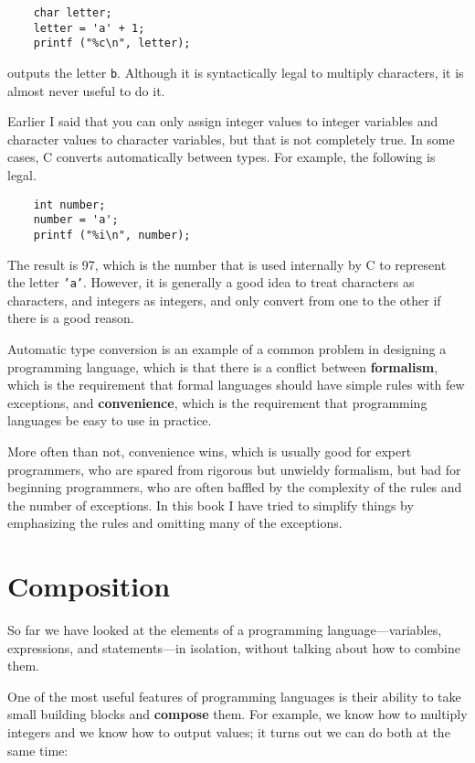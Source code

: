 \begin{verbatim}
    char letter;
    letter = 'a' + 1;
    printf ("%c\n", letter);
\end{verbatim}
%
outputs the letter {\tt b}.  Although it is syntactically legal
to multiply characters, it is almost never useful to do it.

Earlier I said that you can only assign integer values to
integer variables and character values to character variables,
but that is not completely true.  In some cases, C converts
automatically between types.  For example, the following is
legal.

\begin{verbatim}
    int number;
    number = 'a';
    printf ("%i\n", number);
\end{verbatim}
%
The result is 97, which is the number that is used internally
by C to represent the letter {\tt 'a'}.  However, it is
generally a good idea to treat characters as characters, and
integers as integers, and only convert from one to the other
if there is a good reason.

Automatic type conversion is an example of a common problem in designing a
programming language, which is that there is a conflict between {\bf
formalism}, which is the requirement that formal languages should have
simple rules with few exceptions, and {\bf convenience}, which is the
requirement that programming languages be easy to use in practice.

More often than not, convenience wins, which is usually good for
expert programmers, who are spared from rigorous but unwieldy
formalism, but bad for beginning programmers, who are often baffled
by the complexity of the rules and the number of exceptions.  In this
book I have tried to simplify things by emphasizing the rules and
omitting many of the exceptions.


\section{Composition}

So far we have looked at the elements of a programming
language---variables, expressions, and statements---in
isolation, without talking about how to combine them.

One of the most useful features of programming languages
is their ability to take small building blocks and
{\bf compose} them.  For example, we know how to multiply
integers and we know how to output values; it turns out we can
do both at the same time:

